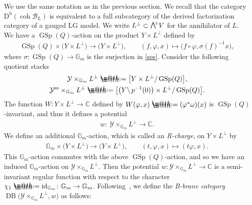 \documentclass[pdftex]{sigma}%
\makeatletter
\newcommand*{\defeq}{\mathrel{\rlap{%
 \raisebox{0.3ex}{$\m@th\cdot$}}%
 \raisebox{-0.3ex}{$\m@th\cdot$}}%
 =}
\numberwithin{equation}{section}
\newcommand{\coh}{\operatorname{coh}}
\newcommand{\Db}{\operatorname{D^b}}
\newcommand{\id}{\operatorname{id}}
\newcommand{\GSp}{\operatorname{GSp}}
\newcommand{\stab}{\operatorname{ss}}
\newcommand{\DB}{\operatorname{DB}}
\newcommand{\cB}{\mathcal{B}}
\newcommand{\cY}{\mathcal{Y}}
\newcommand{\bC}{\mathbb{C}}
\newcommand{\bG}{\mathbb{G}}
\newcommand{\gwedge}{\raisebox{1pt}[0pt][0pt]{$\textstyle \bigwedge^{\raisebox{-1pt}[0pt][0pt]{\tiny\!$2$\,}}$}}
\makeatother
\begin{document}
 We use the same notation as in the previous section. We recall that the category $\Db(\coh \cB_L)$ is equivalent to a full subcategory of the derived factorization category of a gauged LG model. We write $L^{\perp}\subset\gwedge V$ for the annihilator of $L$. We have a $\GSp(Q)$-action on the product $Y\times L^{\perp}$ defined by
 \begin{gather*}
 \GSp(Q)\times \big(Y\times L^{\perp}\big)\to \big(Y\times L^{\perp}\big), \qquad (f, \varphi,x)\mapsto \big(f\circ \varphi, \sigma(f)^{-1}x\big),
 \end{gather*}
 where $\sigma\colon \GSp(Q)\to\bG_m$ is the surjection in \eqref{ses}. Consider the following quotient stacks
\begin{gather*}
 \cY\times_{\bG_m}L^{\perp}\defeq\big[Y\times L^{\perp}/\GSp(Q)\big],
 \\
 \cY^{\stab}\times_{\bG_m}L^{\perp}\defeq\big[\big(Y\backslash\,p^{-1}(0)\big)\times L^{\perp}/\GSp(Q)\big].
 \end{gather*}
 The function $W\colon Y\times L^{\perp}\to \bC$ defined by $W(\varphi,x)\defeq(\varphi^*\omega)(x)$ is $\GSp(Q)$-invariant, and thus it defines a potential
 \begin{gather*}
 w\colon\ \cY\times_{\bG_m}L^{\perp}\to \bC.
 \end{gather*}
 We define an additional $\bG_m$-action, which is called an {\it R-charge}, on $Y\times L^{\perp}$ by
 \begin{gather*}
 \bG_m\times \big(Y\times L^{\perp}\big)\to \big(Y\times L^{\perp}\big),\qquad
 (t, \varphi,x)\mapsto (t\varphi, x).
 \end{gather*}
This $\bG_m$-action commutes with the above $\GSp(Q)$-action, and so we have an induced $\bG_m$-action on $\cY\times_{\bG_m}L^{\perp}$. Then the potential $w\colon \cY\times_{\bG_m}L^{\perp}\to \bC$ is a semi-invariant regular function with respect to the character $\chi_1\defeq\id_{\bG_m}\colon \bG_m\to \bG_m$. Following~\cite{rs}, we define the {\it B-brane category} $\DB\big(\cY\times_{\bG_m}L^{\perp},w\big)$
as follows:
\end{document}
